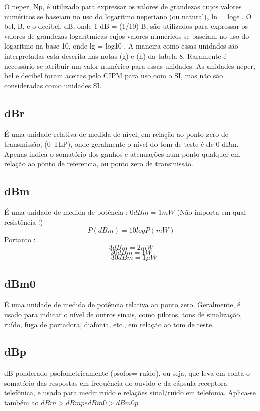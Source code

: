 \documentclass[
	article,			%
	11pt,				%
	oneside,			%
	a4paper,			%
	english,			%
	brazil,				%
	sumario=tradicional
	]{abntex2}
\begin{document}
\begin{citacao}
O neper, Np, é utilizado para expressar os valores de grandezas cujos valores numéricos se baseiam no uso do logaritmo neperiano (ou natural), ln = loge . O bel, B, e o decibel, dB, onde 1 dB = (1/10) B, são utilizados para expressar os valores de
grandezas logarítmicas cujos valores numéricos se baseiam no uso do logaritmo na
base 10, onde lg = log10 . A maneira como essas unidades são interpretadas está
descrita nas notas (g) e (h) da tabela 8. Raramente é necessário se atribuir um valor
numérico para essas unidades. As unidades neper, bel e decibel foram aceitas
pelo CIPM para uso com o SI, mas não são consideradas como unidades SI.\cite{santos2012sistema}
\end{citacao}

\subsection{dBr}
É uma unidade relativa de medida de nível, em relação ao ponto zero de transmissão, (0 TLP), onde geralmente o nível do tom de teste é de 0 dBm.
Apenas indica o somatório dos ganhos e atenuações num ponto qualquer em relação ao ponto de referencia, ou ponto zero de transmissão.

\subsection{dBm}
É uma unidade de medida de potência : $0 dBm = 1 mW$ (Não importa em qual resistência !)
$$P (dBm) = 10 log P (mW)$$
Portanto : 
$$3 dBm = 2 mW$$ $$30 dBm = 1W$$ $$-30 dBm = 1 \mu W$$

\subsection{dBm0}
É uma unidade de medida de potência relativa ao ponto zero.
Geralmente, é usado para indicar o nível de outros sinais, como pilotos, tons de sinalização, ruído, fuga de portadora, diafonia, etc., em relação ao tom de teste.

\subsection{dBp}
dB ponderado psofometricamente (psofos= ruído), ou seja, que leva
em conta o somatório das respostas em frequência do ouvido e da cápsula
receptora telefônica, e usado para medir ruído e relações sinal/ruído em
telefonia. Aplica-se também ao $dBm > dBmp e dBm0 > dBm0p$
\end{document}
